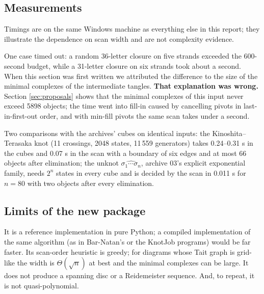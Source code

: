\documentclass[11pt]{article}
\theoremstyle{remark}
\begin{document}
\subsection{Measurements}
Timings are on the same Windows machine as everything else in this report;
they illustrate the dependence on scan width and are not complexity
evidence.

\begin{center}\small
{}
\end{center}

\begin{center}\small
{}
\end{center}

One case timed out: a random 36-letter closure on five strands exceeded the
600-second budget, while a 31-letter closure on six strands took about a
second. When this section was first written we attributed the difference to
the size of the minimal complexes of the intermediate tangles.
\textbf{That explanation was wrong.} Section \ref{sec:proposals} shows that the
minimal complexes of this input never exceed 5898 objects; the time went into
fill-in caused by cancelling pivots in last-in-first-out order, and with
min-fill pivots the same scan takes under a second.

Two comparisons with the archives' cubes on identical inputs: the
Kinoshita--Terasaka knot (11 crossings, 2048 states, 11\,559 generators) takes
0.24--0.31 s in the cubes and 0.07 s in the scan with a boundary of six edges
and at most 66 objects after elimination; the unknot
$\widehat{\sigma_1\cdots\sigma_n}$, archive 03's explicit exponential family,
needs $2^n$ states in every cube and is decided by the scan in 0.011 s for
$n=80$ with two objects after every elimination.

\subsection{Limits of the new package}
It is a reference implementation in pure Python; a compiled implementation of
the same algorithm (as in Bar-Natan's or the KnotJob programs) would be far
faster. Its scan-order heuristic is greedy; for diagrams whose Tait graph is
grid-like the width is $\Theta(\sqrt n)$ at best and the minimal complexes can
be large. It does not produce a spanning disc or a Reidemeister sequence. And,
to repeat, it is not quasi-polynomial.
\end{document}

